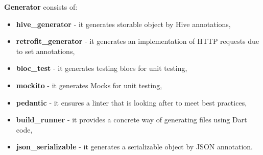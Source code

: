 \textbf{Generator} consists of:
\begin{itemize}
    \item \textbf{hive\_generator} - it generates storable object by Hive annotations,
    \item \textbf{retrofit\_generator} - it generates an implementation of HTTP requests due to set annotations,
    \item \textbf{bloc\_test} - it generates testing blocs for unit testing,
    \item \textbf{mockito} - it generates Mocks for unit testing,
    \item \textbf{pedantic} - it ensures a linter that is looking after to meet best practices,
    \item \textbf{build\_runner} - it provides a concrete way of generating files using Dart code,
    \item \textbf{json\_serializable} - it generates a serializable object by JSON annotation.
\end{itemize}
